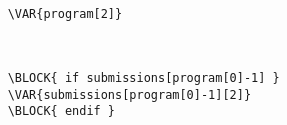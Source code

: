 

{\large {}  } \\[0.5in]
\begin{flushleft}
\begin{lstlisting}
    \VAR{program[2]}
\end{lstlisting}\\[1in]
\end{flushleft}


\begin{lstlisting}
    \BLOCK{ if submissions[program[0]-1] }
    \VAR{submissions[program[0]-1][2]}
    \BLOCK{ endif }
\end{lstlisting}
\pagebreak


